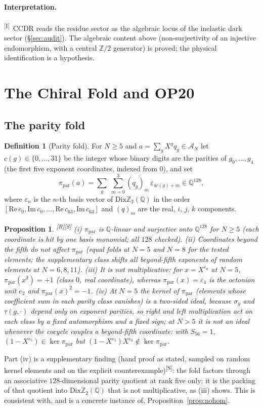 \documentclass[11pt,a4paper]{article}
\newtheorem{proposition}[theorem]{Proposition}
\theoremstyle{definition}
\newtheorem{definition}[theorem]{Definition}
\theoremstyle{remark}
\newcommand{\Q}{\mathbb{Q}}
\newcommand{\Z}{\mathbb{Z}}
\newcommand{\DZ}{\mathrm{Dix}\mathbb{Z}_2(\mathbb{Q})}
\newcommand{\tR}{\textsuperscript{[R]}}
\newcommand{\tS}{\textsuperscript{[S]}}
\newcommand{\tI}{\textsuperscript{[I]}}
\begin{document}
\paragraph{Interpretation.}\tI\ CCDR reads the residue sector as the algebraic locus of the inelastic dark sector (\S\ref{sec:audit}). The algebraic content above (non-surjectivity of an injective endomorphism, with a central $\Z/2$ generator) is proved; the physical identification is a hypothesis.

\section{The Chiral Fold and OP20}\label{sec:fold}
\subsection{The parity fold}
\begin{definition}[Parity fold]\label{def:fold}
For $N\ge5$ and $a=\sum_g X^gq_g\in\mathcal{A}_N$ let $c(g)\in\{0,\dots,31\}$ be the integer whose binary digits are the parities of $g_0,\dots,g_4$ (the first five exponent coordinates, indexed from $0$), and set
\[
\pi_{\mathrm{par}}(a)=\sum_g\;\sum_{m=0}^{3}(q_g)_m\,\varepsilon_{4c(g)+m}\in\Q^{128},
\]
where $\varepsilon_n$ is the $n$-th basis vector of $\DZ$ in the order $[\mathrm{Re}\,c_0,\mathrm{Im}\,c_0,\dots,\mathrm{Re}\,c_{63},\mathrm{Im}\,c_{63}]$ and $(q)_m$ are the real, $i$, $j$, $k$ components.
\end{definition}

\begin{proposition}\label{prop:fold}\tR\tS
(i) $\pi_{\mathrm{par}}$ is $\Q$-linear and surjective onto $\Q^{128}$ for $N\ge5$ (each coordinate is hit by one basis monomial; all $128$ checked). (ii) Coordinates beyond the fifth do not affect $\pi_{\mathrm{par}}$ (equal folds at $N=5$ and $N=8$ for the tested elements; the supplementary class shifts all beyond-fifth exponents of random elements at $N=6,8,11$). (iii) It is not multiplicative: for $x=X^{e_0}$ at $N=5$, $\pi_{\mathrm{par}}(x^2)=+1$ (class $0$, real coordinate), whereas $\pi_{\mathrm{par}}(x)=\varepsilon_4$ is the octonion unit $e_2$ and $\pi_{\mathrm{par}}(x)^2=-1$. (iv) At $N=5$ the kernel of $\pi_{\mathrm{par}}$ (elements whose coefficient sum in each parity class vanishes) is a two-sided ideal, because $\sigma_g$ and $\tau(g,\cdot)$ depend only on exponent parities, so right and left multiplication act on each class by a fixed automorphism and a fixed sign; at $N>5$ it is not an ideal whenever the cocycle couples a beyond-fifth coordinate: with $S_{56}=1$, $(1-X^{e_5})\in\ker\pi_{\mathrm{par}}$ but $(1-X^{e_5})X^{e_6}\notin\ker\pi_{\mathrm{par}}$.
\end{proposition}
\noindent Part (iv) is a supplementary finding (hand proof as stated, sampled on random kernel elements and on the explicit counterexample)\tS: the fold factors through an associative $128$-dimensional parity quotient at rank five only; it is the packing of that quotient into $\DZ$ that is not multiplicative, as (iii) shows. This is consistent with, and is a concrete instance of, Proposition~\ref{prop:nohom}.
\end{document}
